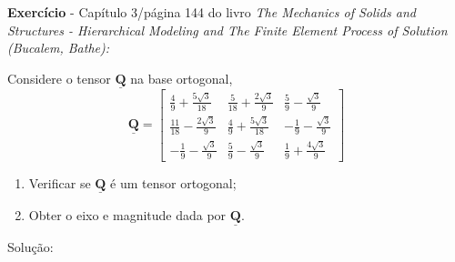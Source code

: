 	\textbf{Exercício} - Capítulo 3/página 144 do livro \textit{The Mechanics of Solids and Structures - Hierarchical Modeling and The Finite Element Process of Solution (Bucalem, Bathe):}
	
	Considere o tensor $\underline{\mathbf{Q}}$ na base ortogonal,
	\[
		\underline{\mathbf{Q}}
		=
		\begin{bmatrix}
			\frac{4}{9}+\frac{5\sqrt{3}}{18} & \frac{5}{18}+\frac{2\sqrt{3}}{9} & \frac{5}{9}-\frac{\sqrt{3}}{9} \\
			\frac{11}{18}-\frac{2\sqrt{3}}{9} & \frac{4}{9}+\frac{5\sqrt{3}}{18} & -\frac{1}{9}-\frac{\sqrt{3}}{9} \\
			-\frac{1}{9}-\frac{\sqrt{3}}{9} & \frac{5}{9}-\frac{\sqrt{3}}{9} & \frac{1}{9}+\frac{4\sqrt{3}}{9}
		\end{bmatrix}
	\]
	
	\begin{enumerate}
		\item Verificar se $\underline{\mathbf{Q}}$ é um tensor ortogonal;
		\item Obter o eixo e magnitude dada por $\underline{\mathbf{Q}}$.
	\end{enumerate}
	
	Solução:
	
